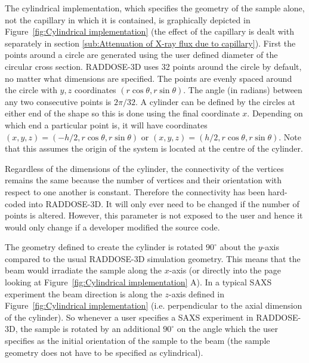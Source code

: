 The cylindrical implementation, which specifies the geometry of the sample alone, not the capillary in which it is contained, is graphically depicted in Figure~\ref{fig:Cylindrical implementation} (the effect of the capillary is dealt with separately in section \ref{sub:Attenuation of X-ray flux due to capillary}).
First the points around a circle are generated using the user defined diameter of the circular cross section.
RADDOSE-3D uses 32 points around the circle by default, no matter what dimensions are specified.
The points are evenly spaced around the circle with $y, z$ coordinates $(r \cos \theta, r \sin \theta)$.
The angle (in radians) between any two consecutive points is $2 \pi / 32$.
A cylinder can be defined by the circles at either end of the shape so this is done using the final coordinate $x$.
Depending on which end a particular point is, it will have coordinates $(x, y, z) = (-h/2, r \cos \theta, r \sin \theta)$ or $(x, y, z) = (h/2, r \cos \theta, r \sin \theta)$.
Note that this assumes the origin of the system is located at the centre of the cylinder.

Regardless of the dimensions of the cylinder, the connectivity of the vertices remains the same because the number of vertices and their orientation with respect to one another is constant.
Therefore the connectivity has been hard-coded into RADDOSE-3D.
It will only ever need to be changed if the number of points is altered.
However, this parameter is not exposed to the user and hence it would only change if a developer modified the source code.

The geometry defined to create the cylinder is rotated $90^{\circ}$ about the $y$-axis compared to the usual RADDOSE-3D simulation geometry.
This means that the beam would irradiate the sample along the $x$-axis (or directly into the page looking at Figure~\ref{fig:Cylindrical implementation} A).
In a typical SAXS experiment the beam direction is along the $z$-axis defined in Figure~\ref{fig:Cylindrical implementation}  (i.e. perpendicular to the axial dimension of the cylinder).
So whenever a user specifies a SAXS experiment in RADDOSE-3D, the sample is rotated by an additional $90^{\circ}$ on the angle which the user specifies as the initial orientation of the sample to the beam (the sample geometry does not have to be specified as cylindrical).

